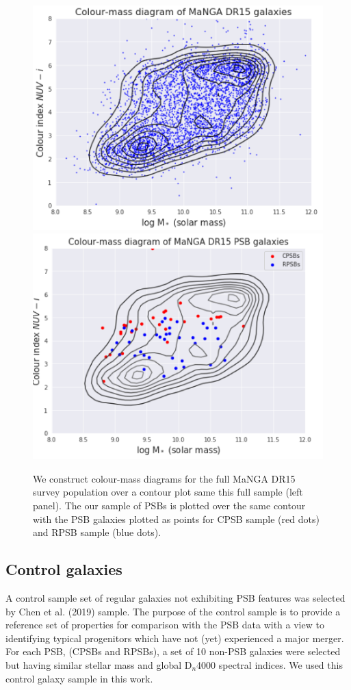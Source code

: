 \begin{figure}
    \centering
    \includegraphics[width=\columnwidth]{images/CMDs/Colour-Mass-DR15-All.png}
    \includegraphics[width=\columnwidth]{images/CMDs/Colour-Mass-DR15-PSBs.png}
    \caption{We construct colour-mass diagrams for the full MaNGA DR15 survey population over a contour plot same this full sample (left panel). The our sample of PSBs is plotted over the same contour with the PSB galaxies plotted as points for CPSB sample (red dots) and RPSB sample (blue dots).}
    \label{fig:Colour-Mass-PSBs}
\end{figure}


\subsection{Control galaxies}
A control sample set of regular galaxies not exhibiting PSB features was selected by Chen et al. (2019) sample. The purpose of the control sample is to provide a reference set of properties for comparison with the PSB data with a view to identifying typical progenitors which have not (yet) experienced a major merger. For each PSB, (CPSBs and RPSBs), a set of 10 non-PSB galaxies were selected but having similar stellar mass and global D$_n$4000 spectral indices. We used this control galaxy sample in this work.

